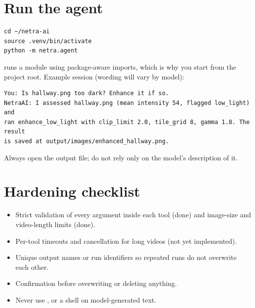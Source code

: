 \section{Run the agent}
\begin{lstlisting}[style=sh]
cd ~/netra-ai
source .venv/bin/activate
python -m netra.agent
\end{lstlisting}
 runs a module using package-aware imports, which is why you start from the project root. Example session (wording will vary by model):
\begin{lstlisting}[style=plain]
You: Is hallway.png too dark? Enhance it if so.
NetraAI: I assessed hallway.png (mean intensity 54, flagged low_light) and
ran enhance_low_light with clip_limit 2.0, tile_grid 8, gamma 1.8. The result
is saved at output/images/enhanced_hallway.png.
\end{lstlisting}
Always open the output file; do not rely only on the model's description of it.

\section{Hardening checklist}
\begin{itemize}
  \item Strict validation of every argument inside each tool (done) and image-size and video-length limits (done).
  \item Per-tool timeouts and cancellation for long videos (not yet implemented).
  \item Unique output names or run identifiers so repeated runs do not overwrite each other.
  \item Confirmation before overwriting or deleting anything.
  \item Never use ,  or a shell on model-generated text.
\end{itemize}
